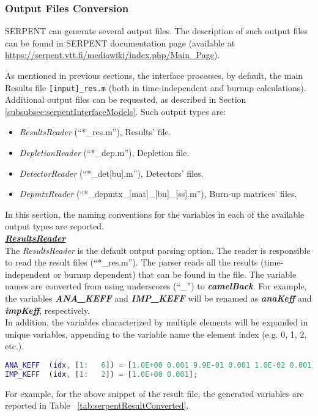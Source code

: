 \subsubsection{Output Files Conversion}
\label{subsubsec:serpentInterfaceOutputConversion}
SERPENT can generate several output files. The description of 
such output files can be found in SERPENT documentation page  
(available at \url{https://serpent.vtt.fi/mediawiki/index.php/Main_Page}).

As mentioned in previous sections, the interface processes, by default, the
main Results file \texttt{[input]\_res.m} (both in time-independent  and burnup calculations).
Additional output files can be requested, as described in Section 
\ref{subsubsec:serpentInterfaceModels}. Such output types are:
\begin{itemize}
   \item  \textit{ResultsReader} (``*\_res.m''), Results’ file.
   \item  \textit{DepletionReader} (``*\_dep.m''), Depletion file.
   \item \textit{DetectorReader}  (``*\_det[bu].m''), Detectors’ files.
   \item  \textit{DepmtxReader} (``*\_depmtx\_[mat]\_[bu]\_[ss].m''), Burn-up matrices’ files.
\end{itemize}

In this section, the naming conventions for the variables in each of the available output types 
are reported.\\

\textit{\textbf{\underline{ResultsReader}}}
\\The \textit{ResultsReader} is the default output parsing option. 
The reader is responsible to read the result files (``*\_res.m'').
The parser reads all the results (time-independent  or burnup dependent) that can
be found in the file.
The variable names are converted from using underscores (``\_'') to \textit{\textbf{camelBack}}. For example,
the variables \textit{\textbf{ANA\_KEFF}} and  \textit{\textbf{IMP\_KEFF}}  will be renamed
 as \textit{\textbf{anaKeff}} and \textit{\textbf{impKeff}}, respectively. 
 \\In addition, the variables characterized by multiple elements will be expanded in unique variables, 
 appending to the variable name the element index (e.g. 0, 1, 2, etc.). 
 \begin{lstlisting}[language={matlab}]
% _res.m file
ANA_KEFF  (idx, [1:   6]) = [1.0E+00 0.001 9.9E-01 0.001 1.0E-02 0.001];
IMP_KEFF  (idx, [1:   2]) = [1.0E+00 0.001];
\end{lstlisting}
For example, for the above snippet of the result file, the generated variables are reported in  Table ~\ref{tab:serpentResultConverted}.

